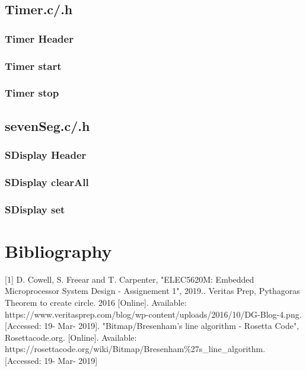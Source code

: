 \documentclass[a4paper,12pt]{article}
\newcommand{\TimerC}{../Timer/Timer.c}
\newcommand{\TimerH}{../Timer/Timer.h}
\newcommand{\sevenSegC}{../sevenSeg/sevenSeg.c}
\newcommand{\sevenSegH}{../sevenSeg/sevenSeg.h}
\begin{document}
\newpage
\subsection{Timer.c/.h}
\subsubsection{Timer Header}

\subsubsection{Timer start}

\subsubsection{Timer stop}


\newpage
\subsection{sevenSeg.c/.h}
\subsubsection{SDisplay Header}

\subsubsection{SDisplay clearAll}

\subsubsection{SDisplay set}

\newpage

\section{Bibliography}
[1] D. Cowell, S. Freear and T. Carpenter, "ELEC5620M: Embedded Microprocessor System Design - Assignement 1", 2019.. \newline
[2] Veritas Prep, Pythagoras Theorem to create circle. 2016 [Online]. Available: \newline https://www.veritasprep.com/blog/wp-content/uploads/2016/10/DG-Blog-4.png. [Accessed: 19- Mar- 2019]. \newline
[3]"Bitmap/Bresenham's line algorithm - Rosetta Code", Rosettacode.org. [Online]. Available: https://rosettacode.org/wiki/Bitmap/Bresenham\%27s\_line\_algorithm. [Accessed: 19- Mar- 2019] \newline
\end{document}
